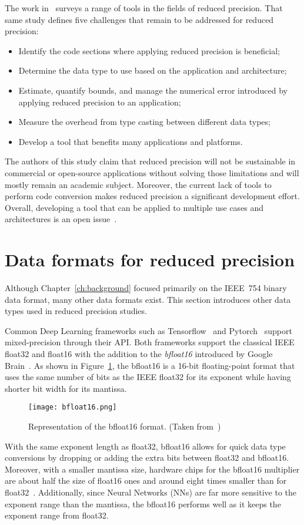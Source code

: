 The work in~\cite{Cherubin2020-tt} surveys a range of tools in the fields of reduced precision.
That same study defines five challenges that remain to be addressed for reduced precision:
\begin{itemize}
	\item[1.] Identify the code sections where applying reduced precision is beneficial;
	\item[2.] Determine the data type to use based on the application and architecture;
	\item[3.] Estimate, quantify bounds, and manage the numerical error introduced by applying reduced precision to an application;
	\item[4.] Measure the overhead from type casting between different data types;
	\item[5.] Develop a tool that benefits many applications and platforms.
\end{itemize}
The authors of this study claim that reduced precision will not be sustainable
in commercial or open-source applications without solving those limitations and
will mostly remain an academic subject.
Moreover, the current lack of tools to perform code conversion makes reduced precision
a significant development effort.
Overall, developing a tool that can be applied to multiple use cases and
architectures is an open issue~\cite{Cherubin2020-tt}.

\section{Data formats for reduced precision}
\label{sc:rp-data-format}
Although Chapter~\ref{ch:background} focused primarily on the IEEE~754 binary data format, many other data formats exist.
This section introduces other data types used in reduced precision studies.

Common Deep Learning frameworks such as Tensorflow~\cite{tensorflow2015-whitepaper} and Pytorch~\cite{PyTorch_2019} support mixed-precision through their API.
Both frameworks support the classical IEEE float32 and float16 with the addition to the \textit{bfloat16} introduced by Google Brain~\cite{bfloat16}.
As shown in Figure~\ref{fig:bfloat16}, the bfloat16 is a 16-bit floating-point format that uses
the same number of bits as the IEEE float32 for its exponent while having shorter bit width for its mantissa.
\begin{figure}[b]
	\centering
	\texttt{[image: bfloat16.png]}
	\caption{Representation of the bfloat16 format. (Taken from~\cite{bfloat16})}
	\label{fig:bfloat16}
\end{figure}
With the same exponent length as float32, bfloat16 allows for quick data type
conversions by dropping or adding the extra bits between float32 and bfloat16.
Moreover, with a smaller mantissa size, hardware chips for the bfloat16 multiplier
are about half the size of float16 ones and around eight times smaller than for float32~\cite{bfloat16}.
Additionally, since Neural Networks (NNs) are far more sensitive to the exponent range than the mantissa,
the bfloat16 performs well as it keeps the exponent range from float32.

